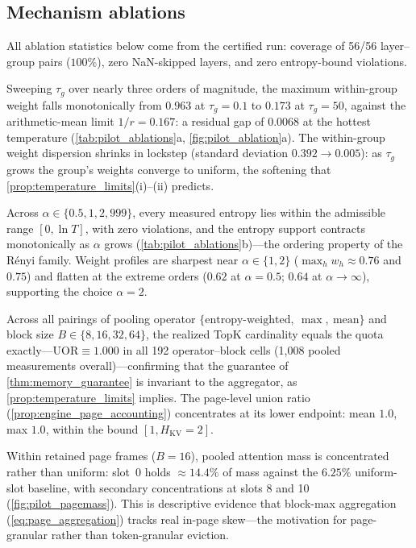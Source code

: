 \documentclass[final,5p,times,twocolumn]{elsarticle}
\theoremstyle{definition}
\theoremstyle{remark}
\newcommand{\HKV}{H_{\mathrm{KV}}}
\newcommand{\UOR}{\mathrm{UOR}}
\begin{document}
\subsection{Mechanism ablations}
\label{subsec:pilot-ablations}

All ablation statistics below come from the certified run: coverage of
56/56 layer--group pairs ($100\%$), zero NaN-skipped layers, and zero
entropy-bound violations.

Sweeping $\tau_g$ over nearly three orders of magnitude, the maximum
within-group weight falls monotonically from $0.963$ at $\tau_g{=}0.1$ to $0.173$ at $\tau_g{=}50$, against the arithmetic-mean limit
 $1/r = 0.167$: a residual gap of $0.0068$ at the hottest temperature
(\cref{tab:pilot_ablations}a, \cref{fig:pilot_ablation}a). The
within-group weight dispersion shrinks in lockstep (standard deviation
 $0.392 \to 0.005$): as $\tau_g$ grows the group's weights converge to
uniform, the softening that \cref{prop:temperature_limits}(i)--(ii)
predicts.

Across $\alpha\in\{0.5,1,2,999\}$, every measured entropy lies within
the admissible range $[0,\ln T]$, with zero violations, and the entropy
support contracts monotonically as $\alpha$ grows
(\cref{tab:pilot_ablations}b)---the ordering property of the R\'enyi
family. Weight profiles are sharpest near $\alpha\in\{1,2\}$ ($\max_h w_h \approx 0.76$ and $0.75$) and flatten at the extreme
orders ($0.62$ at $\alpha{=}0.5$; $0.64$ at $\alpha{\to}\infty$),
supporting the choice $\alpha=2$.

Across all pairings of pooling operator
 $\{\text{entropy-weighted},\ \max,\ \text{mean}\}$ and block size
 $B\in\{8,16,32,64\}$, the realized TopK cardinality equals the quota
exactly---$\UOR \equiv 1.000$ in all 192 operator--block cells
(1{,}008 pooled measurements overall)---confirming that the guarantee
of \cref{thm:memory_guarantee} is invariant to the aggregator, as
\cref{prop:temperature_limits} implies. The page-level union ratio
(\cref{prop:engine_page_accounting}) concentrates at its lower
endpoint: mean $1.0$, max $1.0$, within the bound $[1, \HKV{=}2]$.

Within retained page frames ($B{=}16$), pooled attention mass is
concentrated rather than uniform: slot~0 holds $\approx 14.4\%$ of mass
against the $6.25\%$ uniform-slot baseline, with secondary
concentrations at slots 8 and 10 (\cref{fig:pilot_pagemass}). This is
descriptive evidence that block-max aggregation
(\cref{eq:page_aggregation}) tracks real in-page skew---the
motivation for page-granular rather than token-granular eviction.
\end{document}
